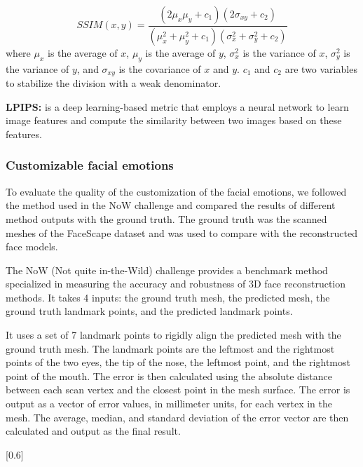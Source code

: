 \begin{equation}
    SSIM(x,y) = \frac{(2\mu_x\mu_y + c_1)(2\sigma_{xy}+c_2)}{(\mu_x^2+\mu_y^2+c_1)(\sigma_x^2+\sigma_y^2+c_2)}
\end{equation}
where $\mu_x$ is the average of $x$, $\mu_y$ is the average of $y$, $\sigma_x^2$ is the variance of $x$, $\sigma_y^2$ is the variance of $y$, and $\sigma_{xy}$ is the covariance of $x$ and $y$. $c_1$ and $c_2$ are two variables to stabilize the division with a weak denominator.


\textbf{LPIPS:}  \cite{zhangUnreasonableEffectivenessDeep2018} is a deep learning-based metric that employs a neural network to learn image features and compute the similarity between two images based on these features.

\subsubsection{Customizable facial emotions}
To evaluate the quality of the customization of the facial emotions, we followed the method used in the NoW challenge and compared the results of different method outputs with the ground truth. The ground truth was the scanned meshes of the FaceScape dataset and was used to compare with the reconstructed face models.

The NoW (Not quite in-the-Wild) challenge \cite{RingNet:CVPR:2019} provides a benchmark method specialized in measuring the accuracy and robustness of 3D face reconstruction methods. It takes 4 inputs: the ground truth mesh, the predicted mesh, the ground truth landmark points, and the predicted landmark points.

It uses a set of 7 landmark points to rigidly align the predicted mesh with the ground truth mesh. The landmark points are the leftmost and the rightmost points of the two eyes, the tip of the nose, the leftmost point, and the rightmost point of the mouth. The error is then calculated using the absolute distance between each scan vertex and the closest point in the mesh surface. The error is output as a vector of error values, in millimeter units, for each vertex in the mesh. The average, median, and standard deviation of the error vector are then calculated and output as the final result.

[0.6]



